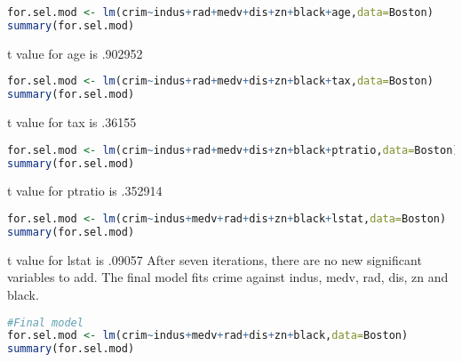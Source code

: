 \documentclass[11pt]{report}
\begin{document}
\begin{itemize}
\begin{lstlisting}[language=R]
for.sel.mod <- lm(crim~indus+rad+medv+dis+zn+black+age,data=Boston)
summary(for.sel.mod)
\end{lstlisting}
t value for age is .902952
\begin{lstlisting}[language=R]
for.sel.mod <- lm(crim~indus+rad+medv+dis+zn+black+tax,data=Boston)
summary(for.sel.mod)
\end{lstlisting}
t value for tax is .36155
\begin{lstlisting}[language=R]
for.sel.mod <- lm(crim~indus+rad+medv+dis+zn+black+ptratio,data=Boston)
summary(for.sel.mod)
\end{lstlisting}
t value for ptratio is .352914
\begin{lstlisting}[language=R]
for.sel.mod <- lm(crim~indus+medv+rad+dis+zn+black+lstat,data=Boston)
summary(for.sel.mod)
\end{lstlisting}
t value for lstat is .09057
After seven iterations, there are no new significant variables to add. The final model fits crime against indus, medv, rad, dis, zn and black. 
\begin{lstlisting}[language=R]
#Final model
for.sel.mod <- lm(crim~indus+medv+rad+dis+zn+black,data=Boston)
summary(for.sel.mod)
\end{lstlisting}


\end{itemize}
\end{document}
